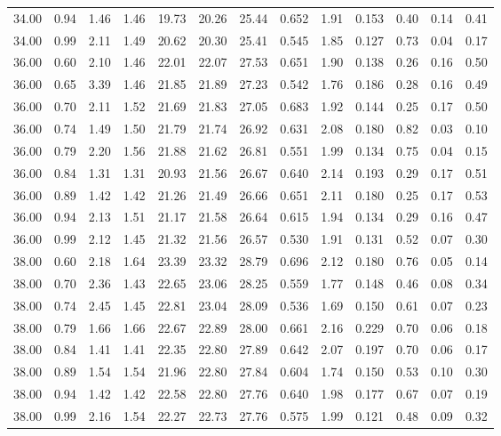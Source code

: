\begin{longtable}{lc|cccc|cc|cc|ccc}
34.00 & 0.94 & 1.46 & 1.46 & 19.73 & 20.26 & 25.44 & 0.652 & 1.91 & 0.153 & 0.40 & 0.14 & 0.41\\
34.00 & 0.99 & 2.11 & 1.49 & 20.62 & 20.30 & 25.41 & 0.545 & 1.85 & 0.127 & 0.73 & 0.04 & 0.17\\
\hline
36.00 & 0.60 & 2.10 & 1.46 & 22.01 & 22.07 & 27.53 & 0.651 & 1.90 & 0.138 & 0.26 & 0.16 & 0.50\\
36.00 & 0.65 & 3.39 & 1.46 & 21.85 & 21.89 & 27.23 & 0.542 & 1.76 & 0.186 & 0.28 & 0.16 & 0.49\\
36.00 & 0.70 & 2.11 & 1.52 & 21.69 & 21.83 & 27.05 & 0.683 & 1.92 & 0.144 & 0.25 & 0.17 & 0.50\\
36.00 & 0.74 & 1.49 & 1.50 & 21.79 & 21.74 & 26.92 & 0.631 & 2.08 & 0.180 & 0.82 & 0.03 & 0.10\\
36.00 & 0.79 & 2.20 & 1.56 & 21.88 & 21.62 & 26.81 & 0.551 & 1.99 & 0.134 & 0.75 & 0.04 & 0.15\\
36.00 & 0.84 & 1.31 & 1.31 & 20.93 & 21.56 & 26.67 & 0.640 & 2.14 & 0.193 & 0.29 & 0.17 & 0.51\\
36.00 & 0.89 & 1.42 & 1.42 & 21.26 & 21.49 & 26.66 & 0.651 & 2.11 & 0.180 & 0.25 & 0.17 & 0.53\\
36.00 & 0.94 & 2.13 & 1.51 & 21.17 & 21.58 & 26.64 & 0.615 & 1.94 & 0.134 & 0.29 & 0.16 & 0.47\\
36.00 & 0.99 & 2.12 & 1.45 & 21.32 & 21.56 & 26.57 & 0.530 & 1.91 & 0.131 & 0.52 & 0.07 & 0.30\\
\hline
38.00 & 0.60 & 2.18 & 1.64 & 23.39 & 23.32 & 28.79 & 0.696 & 2.12 & 0.180 & 0.76 & 0.05 & 0.14\\
38.00 & 0.70 & 2.36 & 1.43 & 22.65 & 23.06 & 28.25 & 0.559 & 1.77 & 0.148 & 0.46 & 0.08 & 0.34\\
38.00 & 0.74 & 2.45 & 1.45 & 22.81 & 23.04 & 28.09 & 0.536 & 1.69 & 0.150 & 0.61 & 0.07 & 0.23\\
38.00 & 0.79 & 1.66 & 1.66 & 22.67 & 22.89 & 28.00 & 0.661 & 2.16 & 0.229 & 0.70 & 0.06 & 0.18\\
38.00 & 0.84 & 1.41 & 1.41 & 22.35 & 22.80 & 27.89 & 0.642 & 2.07 & 0.197 & 0.70 & 0.06 & 0.17\\
38.00 & 0.89 & 1.54 & 1.54 & 21.96 & 22.80 & 27.84 & 0.604 & 1.74 & 0.150 & 0.53 & 0.10 & 0.30\\
38.00 & 0.94 & 1.42 & 1.42 & 22.58 & 22.80 & 27.76 & 0.640 & 1.98 & 0.177 & 0.67 & 0.07 & 0.19\\
38.00 & 0.99 & 2.16 & 1.54 & 22.27 & 22.73 & 27.76 & 0.575 & 1.99 & 0.121 & 0.48 & 0.09 & 0.32\\

\end{longtable}
